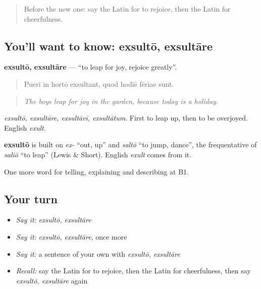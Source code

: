 \begin{quote}
Before the new one: say the Latin for to rejoice, then the Latin for cheerfulness.
\end{quote}

\subsection*{You'll want to know: exsultō, exsultāre}
\textbf{exsultō, exsultāre} — \textquotedblleft{}to leap for joy, rejoice greatly\textquotedblright{}.

\begin{quote}
Puerī in hortō exsultant, quod hodiē fēriae sunt.
\end{quote}

\begin{quote}
\emph{The boys leap for joy in the garden, because today is a holiday.}
\end{quote}

\emph{exsultō, exsultāre, exsultāvī, exsultātum}. First to leap up, then to be overjoyed. English \emph{exult}.

\begin{cousinweb}
\textbf{exsultō} is built on \emph{ex-} \textquotedblleft{}out, up\textquotedblright{} and \emph{saltō} \textquotedblleft{}to jump, dance\textquotedblright{}, the frequentative of \emph{saliō} \textquotedblleft{}to leap\textquotedblright{} (Lewis \& Short). English \emph{exult} comes from it.
\end{cousinweb}

\begin{grammarlens}[title={What you've built}]
One more word for telling, explaining and describing at B1.
\end{grammarlens}

\subsection*{Your turn}
\begin{itemize}
\raggedright
  \item \emph{Say it:} \emph{exsultō, exsultāre}
  \item \emph{Say it:} \emph{exsultō, exsultāre}, once more
  \item \emph{Say it:} a sentence of your own with \emph{exsultō, exsultāre}
  \item \emph{Recall:} say the Latin for to rejoice, then the Latin for cheerfulness, then say \emph{exsultō, exsultāre} again
\end{itemize}

